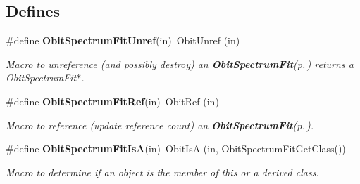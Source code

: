 \subsection*{Defines}
\begin{CompactItemize}
\item 
\#define {\bf Obit\-Spectrum\-Fit\-Unref}(in)\ Obit\-Unref (in)
\begin{CompactList}\small\item\em Macro to unreference (and possibly destroy) an {\bf Obit\-Spectrum\-Fit}{\rm (p.\,\pageref{structObitSpectrumFit})} returns a Obit\-Spectrum\-Fit$\ast$. \item\end{CompactList}\item 
\#define {\bf Obit\-Spectrum\-Fit\-Ref}(in)\ Obit\-Ref (in)
\begin{CompactList}\small\item\em Macro to reference (update reference count) an {\bf Obit\-Spectrum\-Fit}{\rm (p.\,\pageref{structObitSpectrumFit})}. \item\end{CompactList}\item 
\#define {\bf Obit\-Spectrum\-Fit\-Is\-A}(in)\ Obit\-Is\-A (in, Obit\-Spectrum\-Fit\-Get\-Class())
\begin{CompactList}\small\item\em Macro to determine if an object is the member of this or a derived class. \item\end{CompactList}\end{CompactItemize}
